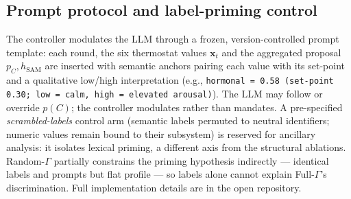 \documentclass{article}
\begin{document}
\begin{table}[h]
\caption{Ablations. Full-$\Gamma$ uses all six thermostats; ablations remove, permute, or collapse selected regulatory components.}
\label{tab:ablaciones}
\centering
\small
{}
\end{table}

\subsection{Prompt protocol and label-priming control}\label{sec:prompt-protocol}

The controller modulates the LLM through a frozen, version-controlled prompt template: each round, the six thermostat values $\mathbf{x}_t$ and the aggregated proposal $p_C, h_{\mathrm{SAM}}$ are inserted with semantic anchors pairing each value with its set-point and a qualitative low/high interpretation (e.g., \texttt{hormonal = 0.58 (set-point 0.30; low = calm, high = elevated arousal)}). The LLM may follow or override $p(C)$; the controller modulates rather than mandates. A pre-specified \emph{scrambled-labels} control arm (semantic labels permuted to neutral identifiers; numeric values remain bound to their subsystem) is reserved for ancillary analysis: it isolates lexical priming, a different axis from the structural ablations. Random-$\Gamma$ partially constrains the priming hypothesis indirectly --- identical labels and prompts but flat profile --- so labels alone cannot explain Full-$\Gamma$'s discrimination. Full implementation details are in the open repository.
\end{document}
